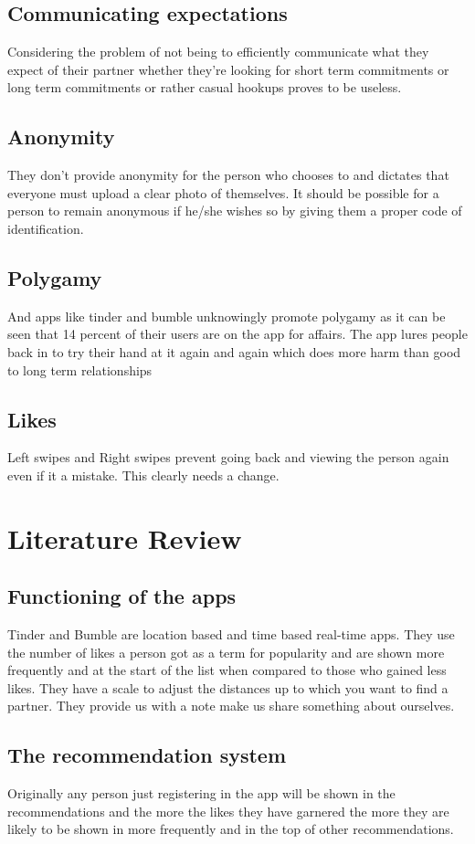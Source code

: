 \documentclass[conference]{IEEEtran}
\begin{document}
\subsection{Communicating expectations}
Considering the problem of not being to efficiently communicate what they expect of their partner whether they're looking for short term commitments or long term commitments or rather casual hookups proves to be useless. 
\subsection{Anonymity}
They don't provide anonymity for the person who chooses to and dictates that everyone must upload a clear photo of themselves. It should be possible for a person to remain anonymous if he/she wishes so by giving them a proper code of identification.
\subsection{Polygamy}
And apps like tinder and bumble unknowingly promote polygamy as it can be seen that 14 percent of their users are on the app for affairs. The app lures people back in to try their hand at it again and again which does more harm than good to long term relationships
\subsection{Likes}
Left swipes and Right swipes prevent going back and viewing the person again even if it a mistake. This clearly needs a change.

\section{Literature Review}

\subsection{Functioning of the apps}
Tinder and Bumble are location based and time based real-time apps. They use the number of likes a person got as a term for popularity and are shown more frequently and at the start of the list when compared to those who gained less likes. They have a scale to adjust the distances up to which you want to find a partner. They provide us with a note make us share something about ourselves.

\subsection{The recommendation system}
Originally any person just registering in the app will be shown in the recommendations and the more the likes they have garnered the more they are likely to be shown in more frequently and in the top of other recommendations.
\end{document}
